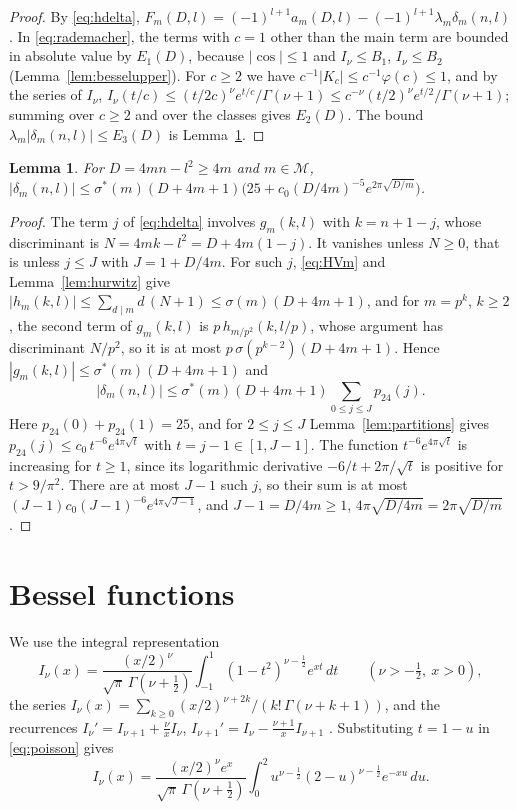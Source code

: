 \documentclass[11pt]{amsart}
\newtheorem{lemma}[theorem]{Lemma}
\theoremstyle{definition}
\newcommand{\pf}{p_{24}}
\newcommand{\Mset}{\mathcal{M}}
\begin{document}
\begin{proof}
By \eqref{eq:hdelta}, $F_m(D,l)=(-1)^{l+1}a_m(D,l)-(-1)^{l+1}\lambda_m\delta_m(n,l)$. In \eqref{eq:rademacher}, the terms with $c=1$ other than the main term are bounded in absolute value by $E_1(D)$, because $|\cos|\le1$ and $I_\nu\le B_1$, $I_\nu\le B_2$ (Lemma~\ref{lem:besselupper}). For $c\ge2$ we have $c^{-1}|K_c|\le c^{-1}\varphi(c)\le1$, and by the series of $I_\nu$, $I_\nu(t/c)\le(t/2c)^\nu e^{t/c}/\Gamma(\nu+1)\le c^{-\nu}(t/2)^\nu e^{t/2}/\Gamma(\nu+1)$; summing over $c\ge2$ and over the classes gives $E_2(D)$. The bound $\lambda_m|\delta_m(n,l)|\le E_3(D)$ is Lemma~\ref{lem:deltabound}.
\end{proof}

\begin{lemma}\label{lem:deltabound}
For $D=4mn-l^2\ge4m$ and $m\in\Mset$, $|\delta_m(n,l)|\le\sigma^*(m)(D+4m+1)\bigl(25+c_0(D/4m)^{-5}e^{2\pi\sqrt{D/m}}\bigr)$.
\end{lemma}

\begin{proof}
The term $j$ of \eqref{eq:hdelta} involves $g_m(k,l)$ with $k=n+1-j$, whose discriminant is $N=4mk-l^2=D+4m(1-j)$. It vanishes unless $N\ge0$, that is unless $j\le J$ with $J=1+D/4m$. For such $j$, \eqref{eq:HVm} and Lemma~\ref{lem:hurwitz} give $|h_m(k,l)|\le\sum_{d\mid m}d\,(N+1)\le\sigma(m)(D+4m+1)$, and for $m=p^k$, $k\ge2$, the second term of $g_m(k,l)$ is $p\,h_{m/p^2}(k,l/p)$, whose argument has discriminant $N/p^2$, so it is at most $p\,\sigma(p^{k-2})(D+4m+1)$. Hence $|g_m(k,l)|\le\sigma^*(m)(D+4m+1)$ and
\[
|\delta_m(n,l)|\le\sigma^*(m)(D+4m+1)\sum_{0\le j\le J}\pf(j).
\]
Here $\pf(0)+\pf(1)=25$, and for $2\le j\le J$ Lemma~\ref{lem:partitions} gives $\pf(j)\le c_0\,t^{-6}e^{4\pi\sqrt t}$ with $t=j-1\in[1,J-1]$. The function $t^{-6}e^{4\pi\sqrt t}$ is increasing for $t\ge1$, since its logarithmic derivative $-6/t+2\pi/\sqrt t$ is positive for $t>9/\pi^2$. There are at most $J-1$ such $j$, so their sum is at most $(J-1)c_0(J-1)^{-6}e^{4\pi\sqrt{J-1}}$, and $J-1=D/4m\ge1$, $4\pi\sqrt{D/4m}=2\pi\sqrt{D/m}$.
\end{proof}

\section{Bessel functions}\label{sec:bessel}

We use the integral representation \cite[\S3.71]{Wat44}
\begin{equation}\label{eq:poisson}
I_\nu(x)=\frac{(x/2)^\nu}{\sqrt\pi\,\Gamma(\nu+\frac12)}\int_{-1}^1(1-t^2)^{\nu-\frac12}e^{xt}\,dt\qquad(\nu>-\tfrac12,\ x>0),
\end{equation}
the series $I_\nu(x)=\sum_{k\ge0}(x/2)^{\nu+2k}/(k!\,\Gamma(\nu+k+1))$, and the recurrences $I_\nu'=I_{\nu+1}+\frac\nu xI_\nu$, $I_{\nu+1}'=I_\nu-\frac{\nu+1}xI_{\nu+1}$ \cite[\S3.71]{Wat44}. Substituting $t=1-u$ in \eqref{eq:poisson} gives
\begin{equation}\label{eq:poisson2}
I_\nu(x)=\frac{(x/2)^\nu e^x}{\sqrt\pi\,\Gamma(\nu+\frac12)}\int_0^2u^{\nu-\frac12}(2-u)^{\nu-\frac12}e^{-xu}\,du .
\end{equation}
\end{document}
